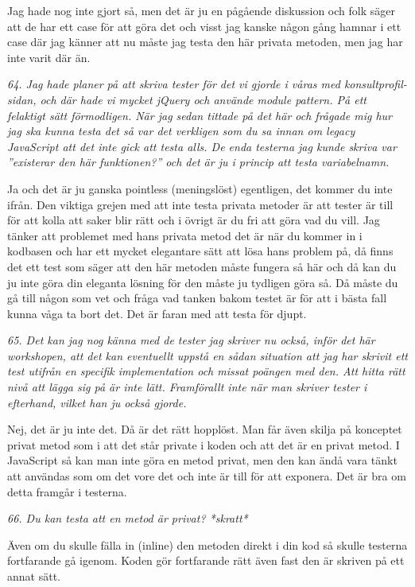 \documentclass[11pt]{article}
\begin{document}
Jag hade nog inte gjort så, men det är ju en pågående diskussion och folk säger att de har ett case för att göra det och visst jag kanske någon gång hamnar i ett case där jag känner att nu måste jag testa den här privata metoden, men jag har inte varit där än.

\emph{64. Jag hade planer på att skriva tester för det vi gjorde i våras med konsultprofil-sidan, och där hade vi mycket jQuery och använde module pattern. På ett felaktigt sätt förmodligen. När jag sedan tittade på det här och frågade mig hur jag ska kunna testa det så var det verkligen som du sa innan om legacy JavaScript att det inte gick att testa alls. De enda testerna jag kunde skriva var ”existerar den här funktionen?” och det är ju i princip att testa variabelnamn.}

Ja och det är ju ganska pointless (meningslöst) egentligen, det kommer du inte ifrån. Den viktiga grejen med att inte testa privata metoder är att tester är till för att kolla att saker blir rätt och i övrigt är du fri att göra vad du vill. Jag tänker att problemet med hans privata metod det är när du kommer in i kodbasen och har ett mycket elegantare sätt att lösa hans problem på, då finns det ett test som säger att den här metoden måste fungera så här och då kan du ju inte göra din eleganta lösning för den måste ju tydligen göra så. Då måste du gå till någon som vet och fråga vad tanken bakom testet är för att i bästa fall kunna våga ta bort det. Det är faran med att testa för djupt.

\emph{65. Det kan jag nog känna med de tester jag skriver nu också, inför det här workshopen, att det kan eventuellt uppstå en sådan situation att jag har skrivit ett test utifrån en specifik implementation och missat poängen med den. Att hitta rätt nivå att lägga sig på är inte lätt. Framförallt inte när man skriver tester i efterhand, vilket han ju också gjorde.}

Nej, det är ju inte det. Då är det rätt hopplöst. Man får även skilja på konceptet privat metod som i att det står private i koden och att det är en privat metod. I JavaScript så kan man inte göra en metod privat, men den kan ändå vara tänkt att användas som om det vore det och inte är till för att exponera. Det är bra om detta framgår i testerna.

\emph{66. Du kan testa att en metod är privat? *skratt*}

Även om du skulle fälla in (inline) den metoden direkt i din kod så skulle testerna fortfarande gå igenom. Koden gör fortfarande rätt även fast den är skriven på ett annat sätt.
\end{document}

